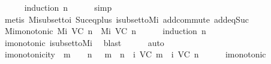 \begin{isabellebody}
%
\isadelimproof
\ \ \ \ %
\endisadelimproof
%
\isatagproof
{}\isamarkupfalse%
\ {\isacharparenleft}induction\ n{\isacharparenright}\isanewline
\ \ \ \ \isamarkupfalse%
\ simp\isanewline
\ \ \ \ \isamarkupfalse%
\ {\isacharparenleft}metis\ Mi{\isacharunderscore}subset{\isacharunderscore}to{\isacharunderscore}{\isasymSigma}i\ Suc{\isacharunderscore}eq{\isacharunderscore}plus{}\ {\isasymSigma}i{\isacharunderscore}subset{\isacharunderscore}to{\isacharunderscore}Mi\ add{\isachardot}commute\ add{\isacharunderscore}{}{\isacharunderscore}eq{\isacharunderscore}Suc{\isacharparenright}\isanewline
\ \ \ \ \isamarkupfalse%
%
\endisatagproof
{\isafoldproof}%
%
\isadelimproof
\isanewline
%
\endisadelimproof
\isanewline
\ \ \isamarkupfalse%
\ Mi{\isacharunderscore}monotonic{\isacharcolon}\ {\isachardoublequoteopen}Mi\ {\isacharparenleft}V{\isacharcomma}C{\isacharcomma}{\isasymepsilon}{\isacharparenright}\ n\ {\isasymsubseteq}\ Mi\ {\isacharparenleft}V{\isacharcomma}C{\isacharcomma}{\isasymepsilon}{\isacharparenright}\ {\isacharparenleft}n{\isacharplus}{}{\isacharparenright}{\isachardoublequoteclose}\isanewline
%
\isadelimproof
\ \ \ \ %
\endisadelimproof
%
\isatagproof
{}\isamarkupfalse%
\ {\isacharparenleft}induction\ n{\isacharparenright}\isanewline
\ \ \ \ \isamarkupfalse%
\isanewline
\ \ \ \ \isamarkupfalse%
\ {\isasymSigma}i{\isacharunderscore}monotonic\ {\isasymSigma}i{\isacharunderscore}subset{\isacharunderscore}to{\isacharunderscore}Mi\ \isamarkupfalse%
\ blast\isanewline
\ \ \ \ \isamarkupfalse%
\ auto\isanewline
\ \ \ \ \isamarkupfalse%
%
\endisatagproof
{\isafoldproof}%
%
\isadelimproof
\isanewline
%
\endisadelimproof
\isanewline
\ \ \isamarkupfalse%
\ {\isasymSigma}i{\isacharunderscore}monotonicity{\isacharcolon}\ {\isachardoublequoteopen}{\isasymforall}\ m\ {\isasymin}\ {\isasymnat}{\isachardot}\ {\isasymforall}\ n\ {\isasymin}\ {\isasymnat}{\isachardot}\ m\ {\isasymle}\ n\ {\isasymlongrightarrow}\ {\isasymSigma}i\ {\isacharparenleft}V{\isacharcomma}C{\isacharcomma}{\isasymepsilon}{\isacharparenright}\ m\ {\isasymsubseteq}\ {\isasymSigma}i\ {\isacharparenleft}V{\isacharcomma}C{\isacharcomma}{\isasymepsilon}{\isacharparenright}\ n{\isachardoublequoteclose}\isanewline
%
\isadelimproof
\ \ \ \ %
\endisadelimproof
%
\isatagproof
{}\isamarkupfalse%
\ {\isasymSigma}i{\isacharunderscore}monotonic\isanewline

\end{isabellebody}
